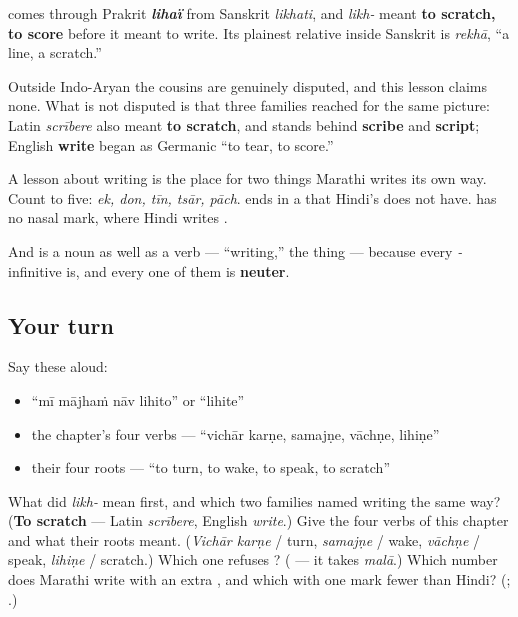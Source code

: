 \begin{cousinweb}
\textbf{} comes through Prakrit \emph{\textbf{lihaï}} from Sanskrit \textbf{} \emph{likhati}, and \emph{likh-} meant \textbf{to scratch, to score} before it meant to write. Its plainest relative inside Sanskrit is \textbf{} \emph{rekhā}, \textquotedblleft{}a line, a scratch.\textquotedblright{}

Outside Indo-Aryan the cousins are genuinely disputed, and this lesson claims none. What is not disputed is that three families reached for the same picture: Latin \emph{scrībere} also meant \textbf{to scratch}, and stands behind \textbf{scribe} and \textbf{script}; English \textbf{write} began as Germanic \textquotedblleft{}to tear, to score.\textquotedblright{}
\end{cousinweb}

\begin{grammarlens}[title={Grammar Lens: what Marathi writes that Hindi does not}]
A lesson about writing is the place for two things Marathi writes its own way. Count to five: \emph{ek, don, tīn, tsār, pāch}. \textbf{} ends in a \textbf{} that Hindi's \textbf{} does not have. \textbf{} has no nasal mark, where Hindi writes \textbf{}.

And \textbf{} is a noun as well as a verb — \textquotedblleft{}writing,\textquotedblright{} the thing — because every \emph{-} infinitive is, and every one of them is \textbf{neuter}.
\end{grammarlens}

\subsection*{Your turn}
Say these aloud:

\begin{itemize}
\raggedright
  \item \textquotedblleft{}mī mājhaṁ nāv lihito\textquotedblright{} or \textquotedblleft{}lihite\textquotedblright{}
  \item the chapter's four verbs — \textquotedblleft{}vichār karṇe, samajṇe, vāchṇe, lihiṇe\textquotedblright{}
  \item their four roots — \textquotedblleft{}to turn, to wake, to speak, to scratch\textquotedblright{}
\end{itemize}

\begin{tcolorbox}[breakable,colback=teal!4,colframe=teal!35!black,title={Before you move on}]
What did \emph{likh-} mean first, and which two families named writing the same way? (\textbf{To scratch} — Latin \emph{scrībere}, English \emph{write}.) Give the four verbs of this chapter and what their roots meant. (\emph{Vichār karṇe} / turn, \emph{samajṇe} / wake, \emph{vāchṇe} / speak, \emph{lihiṇe} / scratch.) Which one refuses \textbf{}? (\textbf{} — it takes \emph{malā}.) Which number does Marathi write with an extra \textbf{}, and which with one mark fewer than Hindi? (\textbf{}; \textbf{}.)
\end{tcolorbox}
